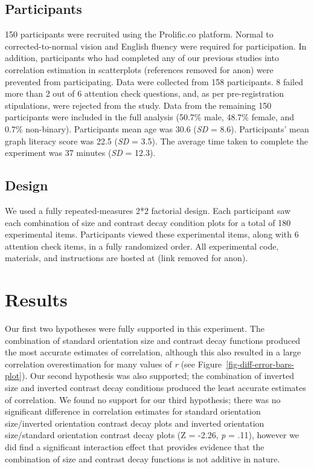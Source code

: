 \documentclass[manuscript, review, anonymous, screen]{acmart}
\begin{document}
\hypertarget{sec-participants}{%
\subsection{Participants}\label{sec-participants}}

150 participants were recruited using the Prolific.co platform. Normal
to corrected-to-normal vision and English fluency were required for
participation. In addition, participants who had completed any of our
previous studies into correlation estimation in scatterplots (references
removed for anon) were prevented from participating. Data were collected
from 158 participants. 8 failed more than 2 out of 6 attention check
questions, and, as per pre-registration stipulations, were rejected from
the study. Data from the remaining 150 participants were included in the
full analysis (50.7\% male, 48.7\% female, and 0.7\% non-binary).
Participants mean age was 30.6 (\emph{SD} = 8.6). Participants' mean
graph literacy score was 22.5 (\emph{SD} = 3.5). The average time taken
to complete the experiment was 37 minutes (\emph{SD} = 12.3).

\hypertarget{sec-design}{%
\subsection{Design}\label{sec-design}}

We used a fully repeated-measures 2*2 factorial design. Each participant
saw each combination of size and contrast decay condition plots for a
total of 180 experimental items. Participants viewed these experimental
items, along with 6 attention check items, in a fully randomized order.
All experimental code, materials, and instructions are hosted at (link
removed for anon).

\hypertarget{sec-results}{%
\section{Results}\label{sec-results}}

Our first two hypotheses were fully supported in this experiment. The
combination of standard orientation size and contrast decay functions
produced the most accurate estimates of correlation, although this also
resulted in a large correlation overestimation for many values of
\emph{r} (see Figure~\ref{fig-diff-error-bars-plot}). Our second
hypothesis was also supported; the combination of inverted size and
inverted contrast decay conditions produced the least accurate estimates
of correlation. We found no support for our third hypothesis; there was
no significant difference in correlation estimates for standard
orientation size/inverted orientation contrast decay plots and inverted
orientation size/standard orientation contrast decay plots (Z = -2.26,
\emph{p} = .11), however we did find a significant interaction effect
that provides evidence that the combination of size and contrast decay
functions is not additive in nature.
\end{document}
